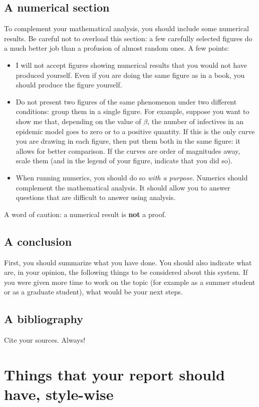 \documentclass[12pt]{article}
\begin{document}
\subsection{A numerical section}
To complement your mathematical analysis, you should include some numerical results. Be careful not to overload this section: a few carefully selected figures do a much better job than a profusion of almost random ones. A few points:
\begin{itemize}
\item I will not accept figures showing numerical results that you would not have produced yourself. Even if you are doing the same figure as in a book, you should produce the figure yourself.
\item Do not present two figures of the same phenomenon under two different conditions: group them in a single figure. For example, suppose you want to show me that, depending on the value of $\beta$, the number of infectives in an epidemic model goes to zero or to a positive quantity. If this is the only curve you are drawing in each figure, then put them both in the same figure: it allows for better comparison. If the curves are order of magnitudes away, scale them (and in the legend of your figure, indicate that you did so).
\item When running numerics, you should do so \emph{with a purpose}. Numerics should complement the mathematical analysis. It should allow you to answer questions that are difficult to answer using analysis. 
\end{itemize}
A word of caution: a numerical result is {\bf not} a proof.

\subsection{A conclusion}
First, you should summarize what you have done. You should also indicate what are, in your opinion, the following things to be considered about this system. If you were given more time to work on the topic (for example as a summer student or as a graduate student), what would be your next steps.

\subsection{A bibliography}
Cite your sources. Always!

\section{Things that your report should have, style-wise}
\end{document}

